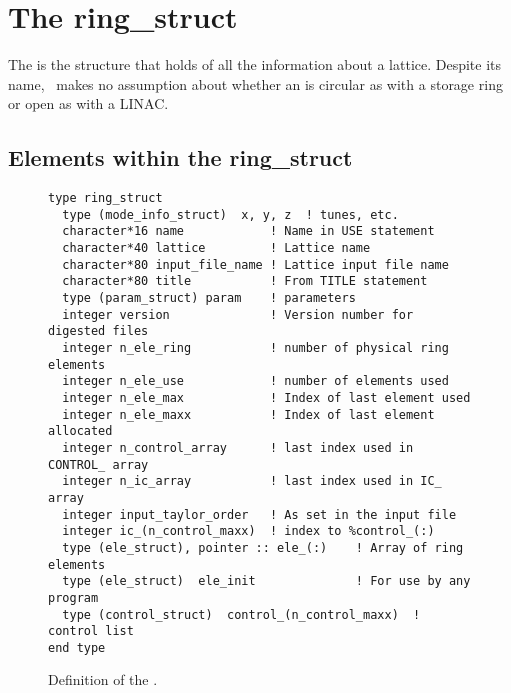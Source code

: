 \chapter{The ring\_struct}
\label{c:ring_struct}

The  is the structure that holds of all the information 
about a lattice.   Despite its name, \bmad\
makes no assumption about whether an  is circular as
with a storage ring or open as with a LINAC.

\section{Elements within the ring\_struct}

\begin{figure}[htb]
\centering
\begin{verbatim}
type ring_struct
  type (mode_info_struct)  x, y, z  ! tunes, etc.
  character*16 name            ! Name in USE statement
  character*40 lattice         ! Lattice name
  character*80 input_file_name ! Lattice input file name
  character*80 title           ! From TITLE statement
  type (param_struct) param    ! parameters
  integer version              ! Version number for digested files
  integer n_ele_ring           ! number of physical ring elements
  integer n_ele_use            ! number of elements used
  integer n_ele_max            ! Index of last element used
  integer n_ele_maxx           ! Index of last element allocated
  integer n_control_array      ! last index used in CONTROL_ array
  integer n_ic_array           ! last index used in IC_ array
  integer input_taylor_order   ! As set in the input file
  integer ic_(n_control_maxx)  ! index to %control_(:)
  type (ele_struct), pointer :: ele_(:)    ! Array of ring elements
  type (ele_struct)  ele_init              ! For use by any program
  type (control_struct)  control_(n_control_maxx)  ! control list
end type
\end{verbatim}
\caption{Definition of the .}
\label{f:ring_struct}
\end{figure}

